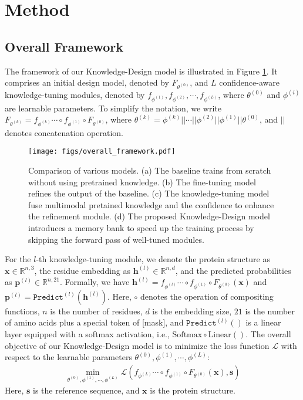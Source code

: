 \documentclass{article}
\begin{document}
 \section{Method}
\subsection{Overall Framework}
The framework of our Knowledge-Design model is illustrated in Figure \ref{fig:framework}. It comprises an initial design model, denoted by $F_{\theta^{(0)}}$, and $L$ confidence-aware knowledge-tuning modules, denoted by $f_{\phi^{(1)}}, f_{\phi^{(2)}}, \cdots, f_{\phi^{(L)}}$, where $\theta^{(0)}$ and $\phi^{(i)}$ are learnable parameters. To simplify the notation, we write $F_{\theta^{(k)}} = f_{\phi^{(k)}} \cdots \circ f_{\phi^{(1)}} \circ F_{\theta^{(0)}}$, where $\theta^{(k)} = \phi^{(k)} || \cdots || \phi^{(2)} || \phi^{(1)} || \theta^{(0)}$, and $||$ denotes concatenation operation. 




\begin{figure}[h]
    \centering
    \texttt{[image: figs/overall\_framework.pdf]}
    \caption{Comparison of various models. (a) The baseline trains from scratch without using pretrained knowledge. (b) The fine-tuning model refines the output of the baseline. (c) The knowledge-tuning model fuse multimodal pretained knowledge and the confidence to enhance the refinement module. 
    (d) The proposed Knowledge-Design model introduces a memory bank to speed up the training process by skipping the forward pass of well-tuned modules.}
    \label{fig:framework}
    \vspace{-3mm}
 \end{figure}




For the $l$-th knowledge-tuning module, we denote the protein structure as $\boldsymbol{x} \in \mathbb{R}^{n, 3}$, the residue embedding as $\boldsymbol{h}^{(l)} \in \mathbb{R}^{n, d}$, and the predicted probabilities as $\boldsymbol{p}^{(l)} \in \mathbb{R}^{n, 21}$. Formally, we have $\boldsymbol{h}^{(l)} = f_{\phi^{(l)}} \cdots \circ f_{\phi^{(1)}} \circ F_{\theta^{(0)}}(\boldsymbol{x})$ and $\boldsymbol{p}^{(l)} = \texttt{Predict}^{(l)}(\boldsymbol{h}^{(l)})$. Here, $\circ$ denotes the operation of compositing functions, $n$ is the number of residues, $d$ is the embedding size, $21$ is the number of amino acids plus a special token of [mask], and $\texttt{Predict}^{(l)}()$ is a linear layer equipped with a softmax activation, i.e., $\text{Softmax} \circ \text{Linear}()$. The overall objective of our Knowledge-Design model is to minimize the loss function $\mathcal{L}$ with respect to the learnable parameters $\theta^{(0)}, \phi^{(1)}, \cdots, \phi^{(L)}$:
\begin{align}
\min_{\theta^{(0)}, \phi^{(1)}, \cdots, \phi^{(L)}} \mathcal{L}( f_{\phi^{(L)}} \cdots \circ f_{\phi^{(1)}} \circ F_{\theta^{(0)}}(\boldsymbol{x}) , \boldsymbol{s})
\end{align}
Here, $\boldsymbol{s}$ is the reference sequence, and $\boldsymbol{x}$ is the protein structure.
\end{document}
